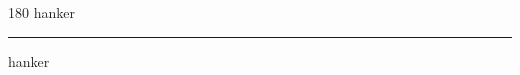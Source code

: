
\begin{frame}
\begin{center}
\begin{turn}{180}
{\fontsize{2.5cm}{1em}\selectfont hanker}
\end{turn}
\vspace{1em}\par  
\hrule
\vspace{1em}\par  
{\fontsize{2.5cm}{1em}\selectfont hanker}
\end{center}
\end{frame}
